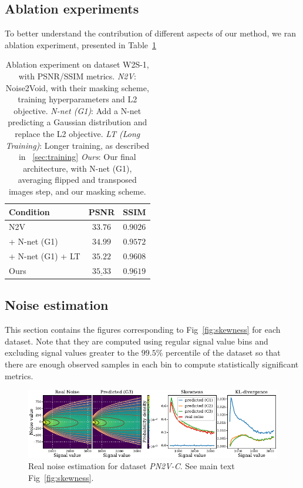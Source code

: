 \documentclass{article}
\begin{document}
\subsection{Ablation experiments}
To better understand the contribution of different aspects of our method, we ran ablation experiment, presented in Table~\ref{si:table:ablation}
\begin{table}[ht]
\caption{Ablation experiment on dataset W2S-1, with PSNR/SSIM metrics.
\textit{N2V}: Noise2Void, with their masking scheme, training hyperparameters and L2 objective.
\textit{N-net (G1)}: Add a N-net predicting a Gaussian distribution and replace the L2 objective.
\textit{LT (Long Training)}: Longer training, as described in ~\ref{sec:training}
\textit{Ours}: Our final architecture, with N-net (G1), averaging flipped and transposed images step, and our masking scheme.
}
\label{si:table:ablation}
\begin{center}
\begin{sc}
\begin{tabular}{lcc}
\toprule
Condition & PSNR & SSIM \\
\midrule
N2V & $33.76$ & $0.9026$\\
 + N-net (G1) & $34.99$ & $0.9572$\\
 + N-net (G1) + LT & $35.22$ & $0.9608$\\
Ours & $\underline{35.33}$ & $\underline{0.9619}$\\
\bottomrule
\end{tabular}
\end{sc}
\end{center}
\end{table}

\FloatBarrier
\subsection{Noise estimation}
\label{si:skewness}
This section contains the figures corresponding to Fig~\ref{fig:skewness} for each dataset.
Note that they are computed using regular signal value bins and excluding signal values greater to the $99.5\%$ percentile of the dataset so that there are enough observed samples in each bin to compute statistically significant metrics.

\begin{figure}[ht]
\begin{center}
\centerline{\includegraphics[width=\columnwidth]{fig_skewness_1col_pn2v-C.pdf}}
\caption{Real noise estimation for dataset \textit{PN2V-C}. See main text Fig~\ref{fig:skewness}.
}
\end{center}
\end{figure}
\end{document}
